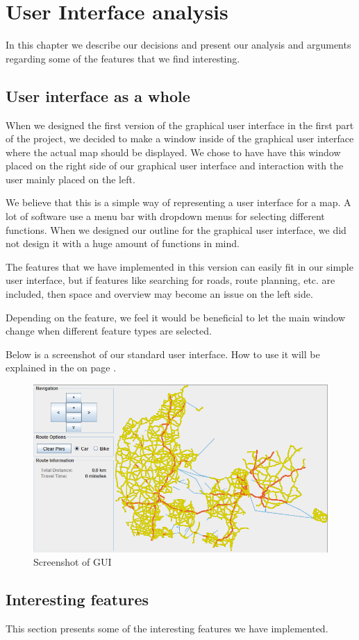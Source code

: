 \chapter{User Interface analysis}
\label{UIA}
In this chapter we describe our decisions and present our analysis and
arguments regarding some of the features that we find interesting.

\section{User interface as a whole}
\label{UIA-UIW}
When we designed the first version of the graphical user interface in the first
part of the project, we decided to make a window inside of the graphical user
interface where the actual map should be displayed. We chose to have have this
window placed on the right side of our graphical user interface and interaction
with the user mainly placed on the left.

We believe that this is a simple way of representing a user interface for a map.
A lot of software use a menu bar with dropdown menus for selecting different
functions. When we designed our outline for the graphical user interface, we did
not design it with a huge amount of functions in mind. 

The features that we have implemented in this version can easily fit in our
simple user interface, but if features like searching for roads, route planning,
etc. are included, then space and overview may become an issue on the left side.

Depending on the feature, we feel it would be beneficial to let the main window
change when different feature types are selected.

Below is a screenshot of our standard user interface. How to use it will be
explained in the  on page \pageref{MAN}.

\begin{figure}[!ht]
\centering
\includegraphics[width=0.5\linewidth]{PictureOfUI}
\caption{Screenshot of GUI}
\label{UIA-UIW-PIC}
\end{figure}
\section{Interesting features}
\label{UIA-IF}
This section presents some of the interesting features we have implemented.
